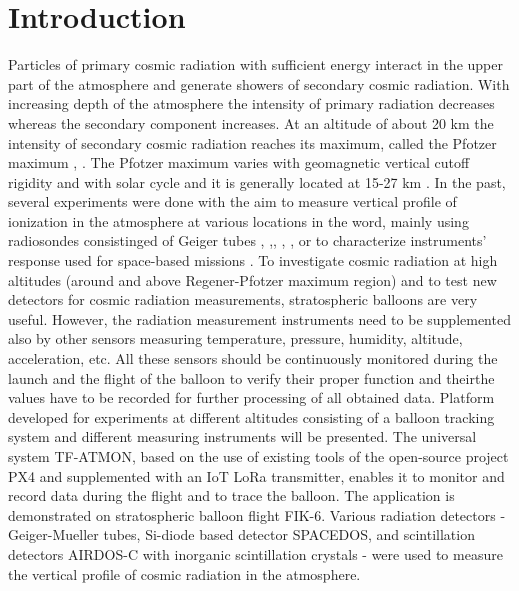 \documentclass{Rpd}
\begin{document}
\maketitle


\section{Introduction}

Particles of primary cosmic radiation with sufficient energy interact in the upper part of the atmosphere and generate showers of secondary cosmic radiation. With increasing depth of the atmosphere the intensity of primary radiation decreases whereas the secondary component increases. At an altitude of about 20 km the intensity of secondary cosmic radiation reaches its maximum, called the Pfotzer maximum \cite{Regener}, \cite{Pfotzer}. The Pfotzer maximum varies with geomagnetic vertical cutoff rigidity and with solar cycle and it is generally located at 15-27 km \cite{Bazilevskaya}.
In the past, several experiments were done with the aim to measure vertical profile of ionization in the atmosphere at various locations in the word, mainly using radiosondes consistinged of Geiger tubes \cite{Bazilevskaya}, \cite{ionization_profile},\cite{Vertical_profile_measurements}, \cite{cosmic_ray_intensity}, \cite{Radioactivity_atmosphere}, or to characterize instruments’ response used for space-based missions \cite{Lawrence} \cite{Mukherjee} \cite{Timepix}.
To investigate cosmic radiation at high altitudes (around and above Regener-Pfotzer maximum region) and to test new detectors for cosmic radiation measurements, stratospheric balloons are very useful.
However, the radiation measurement instruments need to be supplemented also by other sensors measuring temperature, pressure, humidity, altitude, acceleration, etc.  All these sensors should be continuously monitored during the launch and the flight of the balloon to verify their proper function and theirthe values have to be recorded for further processing of all obtained data.
Platform developed for experiments at different altitudes consisting of a balloon tracking system and different measuring instruments will be presented. The universal system TF-ATMON, based on the use of existing tools of the open-source project PX4 and supplemented with an IoT LoRa transmitter, enables it to monitor and record data during the flight and to trace the balloon. The application is demonstrated on stratospheric balloon flight FIK-6. Various radiation detectors - Geiger-Mueller tubes, Si-diode based detector SPACEDOS, and scintillation detectors AIRDOS-C with inorganic scintillation crystals - were used to measure the vertical profile of cosmic radiation in the atmosphere.
\end{document}
